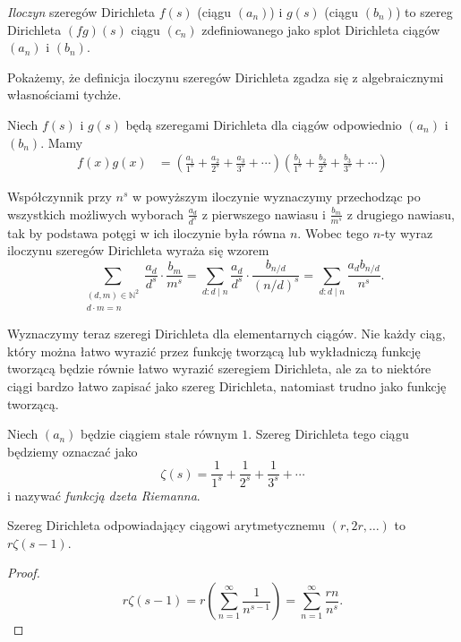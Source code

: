 \documentclass[shortabstract]{imthesis}
\begin{document}
\begin{definition}
    \emph{Iloczyn} szeregów Dirichleta $f(s)$ (ciągu $(a_n)$) i $g(s)$ (ciągu $(b_n)$) to szereg Dirichleta $(fg)(s)$ ciągu $(c_n)$ zdefiniowanego jako splot Dirichleta ciągów $(a_n)$ i $(b_n)$.
\end{definition}

Pokażemy, że definicja iloczynu szeregów Dirichleta zgadza się z algebraicznymi własnościami tychże. 

Niech $f(s)$ i $g(s)$ będą szeregami Dirichleta dla ciągów odpowiednio $(a_n)$ i $(b_n)$. Mamy
\begin{align*}
    f(x)g(x) &= \left(\frac{a_1}{1^s} + \frac{a_2}{2^s} + \frac{a_3}{3^s} + \cdots\right)\left(\frac{b_1}{1^s} + \frac{b_2}{2^s} + \frac{b_3}{3^s} + \cdots\right)
\end{align*}

Współczynnik przy $n^s$ w powyższym iloczynie wyznaczymy przechodząc po wszystkich możliwych wyborach $\frac{a_d}{d^s}$ z pierwszego nawiasu i $\frac{b_{m}}{m^s}$ z drugiego nawiasu, tak by podstawa potęgi w ich iloczynie była równa $n$. Wobec tego $n$-ty wyraz iloczynu szeregów Dirichleta wyraża się wzorem
$$
\sum_{\substack{(d, m) \in \mathbb{N}^2 \\ d \cdot m = n}} \frac{a_d}{d^s} \cdot \frac{b_{m}}{m^s} = \sum_{d : d \mid n} \frac{a_d}{d^s} \cdot \frac{b_{n/d}}{(n/d)^s} = \sum_{d : d \mid n} \frac{a_d b_{n/d}}{n^s}.
$$

Wyznaczymy teraz szeregi Dirichleta dla elementarnych ciągów. Nie każdy ciąg, który można łatwo wyrazić przez funkcję tworzącą lub wykładniczą funkcję tworzącą będzie równie łatwo wyrazić szeregiem Dirichleta, ale za to niektóre ciągi bardzo łatwo zapisać jako szereg Dirichleta, natomiast trudno jako funkcję tworzącą.

\begin{definition}
    Niech $(a_n)$ będzie ciągiem stale równym $1$. Szereg Dirichleta tego ciągu będziemy oznaczać jako
    $$
    \zeta(s) = \frac{1}{1^s} + \frac{1}{2^s} + \frac{1}{3^s} + \cdots
    $$
    i nazywać \emph{funkcją dzeta Riemanna}.
\end{definition}

\begin{remark}
    Szereg Dirichleta odpowiadający ciągowi arytmetycznemu $(r, 2r, \ldots)$ to $r\zeta(s-1)$.
\end{remark}
\begin{proof}
    $$
    r\zeta(s-1) = r\left(\sum_{n=1}^\infty \frac{1}{n^{s-1}}\right) = \sum_{n=1}^\infty \frac{rn}{n^s}.
    $$
\end{proof}
\end{document}
